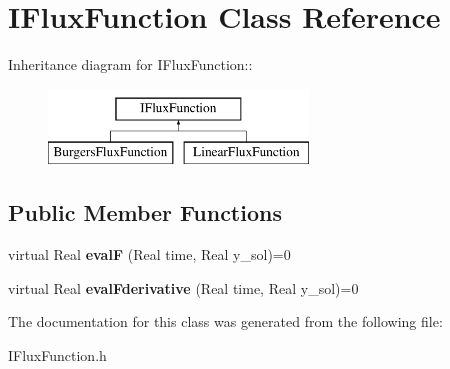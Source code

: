 \hypertarget{classIFluxFunction}{
\section{IFluxFunction Class Reference}
\label{classIFluxFunction}
}
Inheritance diagram for IFluxFunction::\begin{figure}[H]
\begin{center}
\leavevmode
\includegraphics[height=2cm]{classIFluxFunction}
\end{center}
\end{figure}
\subsection*{Public Member Functions}
\begin{DoxyCompactItemize}
\item 
\hypertarget{classIFluxFunction_af3a7d185cf7c2d5e834b8f6872ba2110}{
virtual Real {\bfseries evalF} (Real time, Real y\_\-sol)=0}
\label{classIFluxFunction_af3a7d185cf7c2d5e834b8f6872ba2110}

\item 
\hypertarget{classIFluxFunction_a8747b84cf6abe453ca4ce7871c16275a}{
virtual Real {\bfseries evalFderivative} (Real time, Real y\_\-sol)=0}
\label{classIFluxFunction_a8747b84cf6abe453ca4ce7871c16275a}

\end{DoxyCompactItemize}


The documentation for this class was generated from the following file:\begin{DoxyCompactItemize}
\item 
IFluxFunction.h\end{DoxyCompactItemize}
